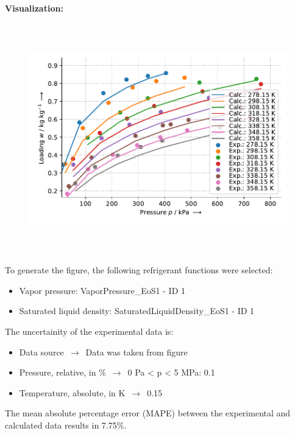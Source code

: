 \textbf{Visualization:}
%
\begin{figure}[!htp]
{\noindent\includegraphics[height=10cm, keepaspectratio]{figs/ads/ads_Propane_activated_carbon_powder_Maxsorb_III_DubininAstakhov_1.pdf}}
\end{figure}
%

To generate the figure, the following refrigerant functions were selected:
\begin{itemize}
\item Vapor pressure: VaporPressure\_EoS1 - ID 1
\item Saturated liquid density: SaturatedLiquidDensity\_EoS1 - ID 1
\end{itemize}

The uncertainity of the experimental data is:
\begin{itemize}
\item Data source $\,\to\,$ Data was taken from figure
\item Pressure, relative, in \% $\,\to\,$ 0 Pa < p < 5 MPa: 0.1%
\item Temperature, absolute, in $\si{\kelvin}$ $\,\to\,$ 0.15
\end{itemize}

The mean absolute percentage error (MAPE) between the experimental and calculated data results in 7.75\%.
\FloatBarrier
\newpage
